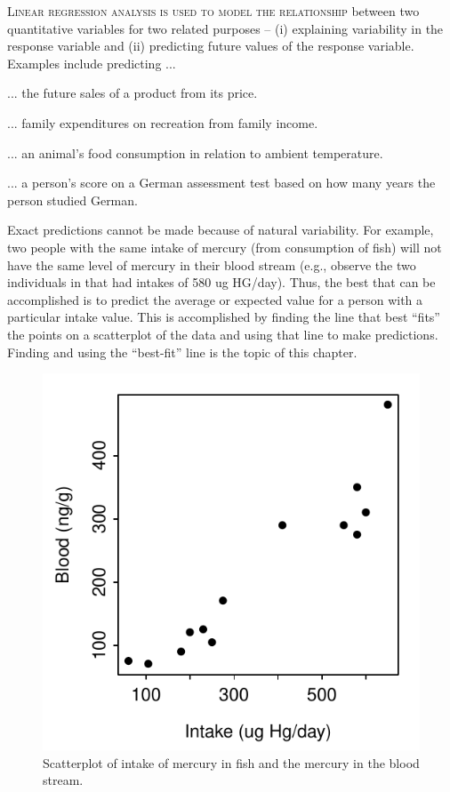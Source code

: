 \documentclass[10pt,openany]{book}\usepackage[]{graphicx}\usepackage[]{color}
\newenvironment{knitrout}{}{} %
\begin{document}
\minitoc
\newpage

\lettrine{L}{inear regression analysis is used to model the relationship} between two quantitative variables for two related purposes -- (i) explaining variability in the response variable and (ii) predicting future values of the response variable.  Examples include predicting ...
\begin{Itemize}
  \item ... the future sales of a product from its price.
  \item ... family expenditures on recreation from family income.
  \item ... an animal's food consumption in relation to ambient temperature.
  \item ... a person's score on a German assessment test based on how many years the person studied German.
\end{Itemize}


Exact predictions cannot be made because of natural variability.  For example, two people with the same intake of mercury (from consumption of fish) will not have the same level of mercury in their blood stream (e.g., observe the two individuals in  that had intakes of 580 ug HG/day).  Thus, the best that can be accomplished is to predict the average or expected value for a person with a particular intake value.  This is accomplished by finding the line that best ``fits'' the points on a scatterplot of the data and using that line to make predictions.  Finding and using the ``best-fit'' line is the topic of this chapter.

\begin{knitrout}
\color{fgcolor}\begin{figure}[hbtp]

{\centering \includegraphics[width=.4\linewidth]{Figs/HGscat-1} 

}

\caption[Scatterplot of intake of mercury in fish and the mercury in the blood stream]{Scatterplot of intake of mercury in fish and the mercury in the blood stream.}\label{fig:HGscat}
\end{figure}


\end{knitrout}
\end{document}
